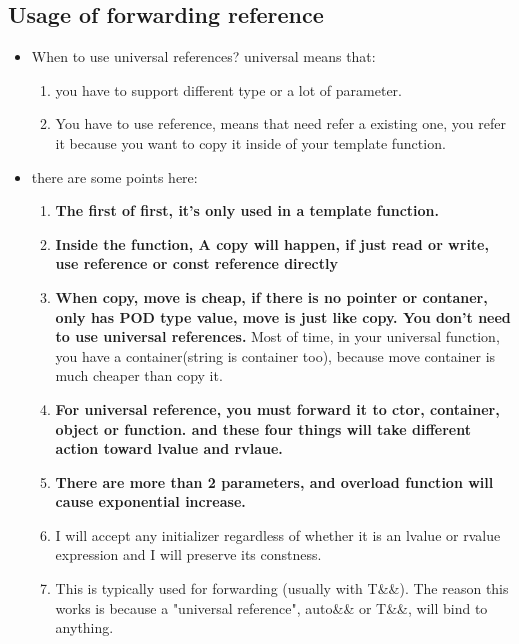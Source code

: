 \documentclass[a4paper,11pt,twoside]{book}
\begin{document}
\subsection{Usage of forwarding reference}
\begin{itemize}
\item When to use universal references? universal means that:
\begin{enumerate}
	\item you have to support different type or a lot of parameter. 
	\item You have to use reference, means that need refer a existing one, you refer it because you want to copy it inside of your template function. 
\end{enumerate}

\item there are some points here:
	\begin{enumerate}
		\item \textbf{The first of first, it's only used in a template function.}
		
		\item \textbf{Inside the function, A copy will happen, if just read or write, use reference or const reference directly}
		
		\item \textbf{When copy, move is cheap, if there is no pointer or contaner, only has POD type value, move is just like copy. You don't need to use universal references.} Most of time, in your universal function, you have a container(string is container too), because move container is much cheaper than copy it.
		
		\item \textbf{For universal reference, you must forward it to ctor, container, object or function. and these four things will take different action toward lvalue and rvlaue.}
		
		\item \textbf{There are more than 2 parameters, and overload function will cause exponential increase.}

		\item I will accept any initializer regardless of whether it is an lvalue or rvalue expression and I will preserve its constness. 

		\item This is typically used for forwarding (usually with T\&\&). The reason this works is because a "universal reference", auto\&\& or T\&\&, will bind to anything.  


\end{enumerate}
\end{itemize}
\end{document}
